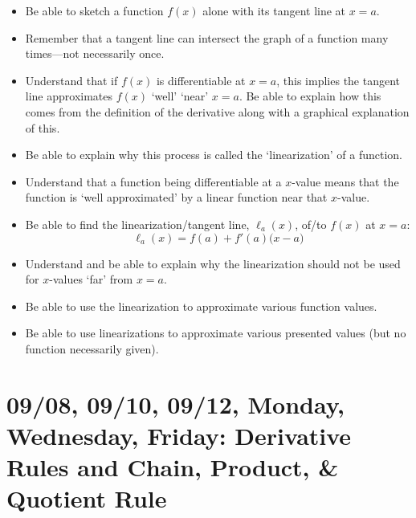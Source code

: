 \documentclass[11pt,letterpaper]{article}
\begin{document}
\begin{itemize}
\item Be able to sketch a function $f(x)$ alone with its tangent line at $x= a$.
\item Remember that a tangent line can intersect the graph of a function many times---not necessarily once.
\item Understand that if $f(x)$ is differentiable at $x= a$, this implies the tangent line approximates $f(x)$ `well' `near' $x= a$. Be able to explain how this comes from the definition of the derivative along with a graphical explanation of this. 
\item Be able to explain why this process is called the `linearization' of a function. 
\item Understand that a function being differentiable at a $x$-value means that the function is `well approximated' by a linear function near that $x$-value.
\item Be able to find the linearization/tangent line, $\ell_a(x)$, of/to $f(x)$ at $x= a$:
	\[
	\ell_a(x)= f(a) + f'(a) \big( x - a \big)
	\]
\item Understand and be able to explain why the linearization should not be used for $x$-values `far' from $x= a$.
\item Be able to use the linearization to approximate various function values. 
\item Be able to use linearizations to approximate various presented values (but no function necessarily given).
\end{itemize}

\newpage
\section*{09/08, 09/10, 09/12, Monday, Wednesday, Friday: Derivative Rules and Chain, Product, \& Quotient Rule\label{09-08--09-12}}
\end{document}
